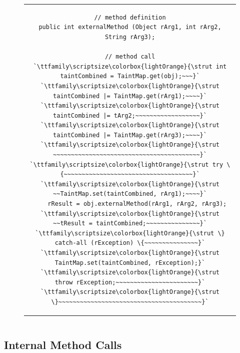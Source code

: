 \documentclass[12pt,twoside,notitlepage]{report}
\newcommand{\highlight}[1]{\colorbox{lightOrange}{\strut #1}}
\newcommand{\lsthl}[1] {\ttfamily\scriptsize\highlight{#1}}
\begin{document}
\begin{figure}
	\centering
	\begin{tabular}{c}
	\begin{lstlisting}
// method definition
public int externalMethod (Object rArg1, int rArg2, String rArg3);

// method call
`\lsthl{int taintCombined = TaintMap.get(obj);~~~}`
`\lsthl{taintCombined |= TaintMap.get(rArg1);~~~~}`
`\lsthl{taintCombined |= tArg2;~~~~~~~~~~~~~~~~~~}`
`\lsthl{taintCombined |= TaintMap.get(rArg3);~~~~}`
`\lsthl{~~~~~~~~~~~~~~~~~~~~~~~~~~~~~~~~~~~~~~~~~}`
`\lsthl{try \{~~~~~~~~~~~~~~~~~~~~~~~~~~~~~~~~~~~~}`
`\lsthl{~~TaintMap.set(taintCombined, rArg1);~~~~}`
	rResult = obj.externalMethod(rArg1, rArg2, rArg3);
`\lsthl{~~tResult = taintCombined;~~~~~~~~~~~~~~~}`
`\lsthl{\} catch-all (rException) \{~~~~~~~~~~~~~~~}`
`\lsthl{	TaintMap.set(taintCombined, rException);}`
`\lsthl{	throw rException;~~~~~~~~~~~~~~~~~~~~~~~}`
`\lsthl{\}~~~~~~~~~~~~~~~~~~~~~~~~~~~~~~~~~~~~~~~~}`
	\end{lstlisting}
	\end{tabular}
	\begin{lstlisting}[caption={Instrumentation of external method calls. The second and third arguments do not inherit combined taint because they are immutable.},
	                   label={listing:TaintPropagation_ExternalMethodCall}]
	\end{lstlisting}
\end{figure}

\subsection{Internal Method Calls}
\label{section:TaintPropagation_MethodCalls_Internal}
\end{document}

